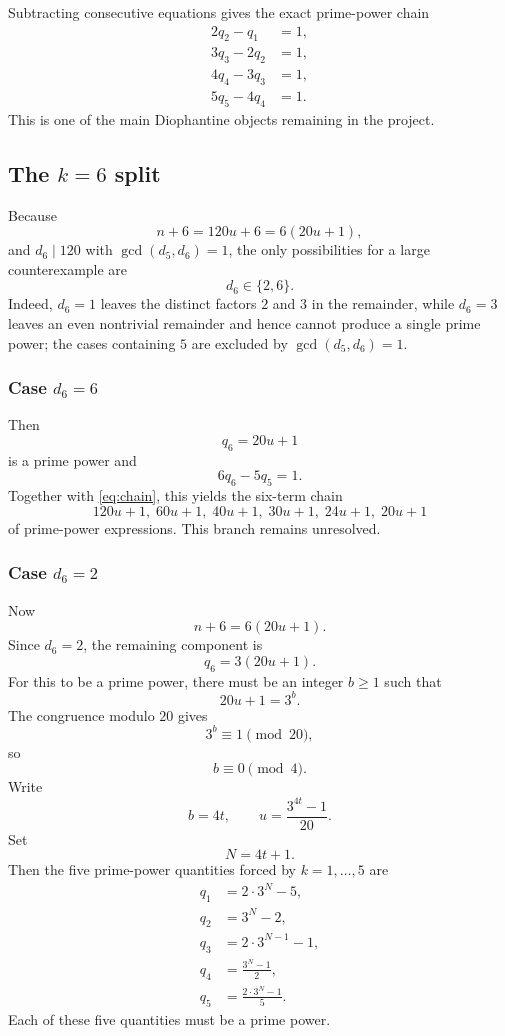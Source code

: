 \documentclass[11pt]{article}
\begin{document}
Subtracting consecutive equations gives the exact prime-power chain
\[
\boxed{
\begin{aligned}
2q_2-q_1&=1,\\
3q_3-2q_2&=1,\\
4q_4-3q_3&=1,\\
5q_5-4q_4&=1.
\end{aligned}}
\tag{34}\label{eq:chain}
\]
This is one of the main Diophantine objects remaining in the project.

\subsection{The $k=6$ split}

Because
\[
n+6=120u+6=6(20u+1),
\]
and $d_6\mid120$ with $\gcd(d_5,d_6)=1$, the only possibilities for a
large counterexample are
\[
\boxed{d_6\in\{2,6\}.}
\tag{35}
\]
Indeed, $d_6=1$ leaves the distinct factors $2$ and $3$ in the remainder,
while $d_6=3$ leaves an even nontrivial remainder and hence cannot produce a
single prime power; the cases containing $5$ are excluded by
$\gcd(d_5,d_6)=1$.

\subsubsection{Case $d_6=6$}

Then
\[
q_6=20u+1
\]
is a prime power and
\[
\boxed{6q_6-5q_5=1.}
\tag{36}\label{eq:q6chain}
\]
Together with \eqref{eq:chain}, this yields the six-term chain
\[
\boxed{
120u+1,\;
60u+1,\;
40u+1,\;
30u+1,\;
24u+1,\;
20u+1
}
\tag{37}\label{eq:qpowers}
\]
of prime-power expressions.  This branch remains unresolved.

\subsubsection{Case $d_6=2$}

Now
\[
n+6=6(20u+1).
\]
Since $d_6=2$, the remaining component is
\[
q_6=3(20u+1).
\]
For this to be a prime power, there must be an integer $b\ge1$ such that
\[
20u+1=3^b.
\]
The congruence modulo $20$ gives
\[
3^b\equiv1\pmod{20},
\]
so
\[
\boxed{b\equiv0\pmod4.}
\]
Write
\[
b=4t,
\qquad
u=\frac{3^{4t}-1}{20}.
\tag{38}\label{eq:expfamily}
\]
Set
\[
N=4t+1.
\]
Then the five prime-power quantities forced by $k=1,\ldots,5$ are
\[
\boxed{
\begin{aligned}
q_1&=2\cdot3^N-5,\\
q_2&=3^N-2,\\
q_3&=2\cdot3^{N-1}-1,\\
q_4&=\frac{3^N-1}{2},\\
q_5&=\frac{2\cdot3^N-1}{5}.
\end{aligned}}
\tag{40}\label{eq:d6two-system}
\]
Each of these five quantities must be a prime power.
\end{document}
